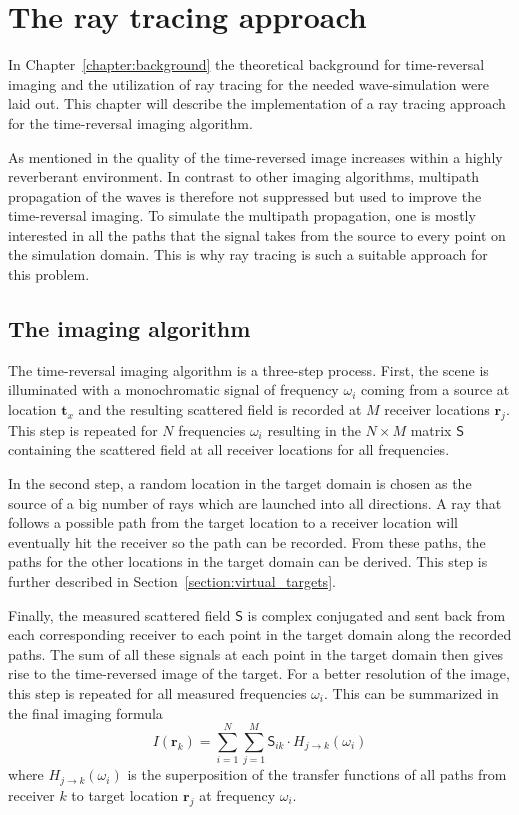 
\chapter{The ray tracing approach}\label{chapter:the_raytracing_approach}
In Chapter~\ref{chapter:background} the theoretical background for time-reversal imaging and the utilization of ray tracing for the needed wave-simulation were laid out.
This chapter will describe the implementation of a ray tracing approach for the time-reversal imaging algorithm.

As mentioned in \parencite{dyab_critical_2013} the quality of the time-reversed image increases within a highly reverberant environment.
In contrast to other imaging algorithms, multipath propagation of the waves is therefore not suppressed but used to improve the time-reversal imaging.
To simulate the multipath propagation, one is mostly interested in all the paths that the signal takes from the source to every point on the simulation domain.
This is why ray tracing is such a suitable approach for this problem.

\section{The imaging algorithm}
The time-reversal imaging algorithm is a three-step process.
First, the scene is illuminated with a monochromatic signal of frequency \(\omega_i\) coming from a source at location \(\mathbf{t}_x\) and the resulting scattered field is recorded at \(M\) receiver locations \(\mathbf{r}_j\). 
This step is repeated for \(N\) frequencies \(\omega_i\) resulting in the \(N \times M\) matrix \(\mathsf{S} \) containing the scattered field at all receiver locations for all frequencies.

In the second step, a random location in the target domain is chosen as the source of a big number of rays which are launched into all directions.
A ray that follows a possible path from the target location to a receiver location will eventually hit the receiver so the path can be recorded.
From these paths, the paths for the other locations in the target domain can be derived.
This step is further described in Section~\ref{section:virtual_targets}.

Finally, the measured scattered field \(\mathsf{S}\) is complex conjugated and sent back from each corresponding receiver to each point in the target domain along the recorded paths.
The sum of all these signals at each point in the target domain then gives rise to the time-reversed image of the target.
For a better resolution of the image, this step is repeated for all measured frequencies \(\omega_i\).
This can be summarized in the final imaging formula
\begin{equation}
    I(\mathbf{r}_k) = \sum_{i=1}^{N} \sum_{j=1}^{M} \mathsf{S}_{ik} \cdot H_{j \rightarrow k}(\omega_i)
\end{equation}
where \(H_{j \rightarrow k}(\omega_i )\) is the superposition of the transfer functions of all paths from receiver \(k\) to target location \(\mathbf{r}_j\) at frequency \(\omega_i\).


